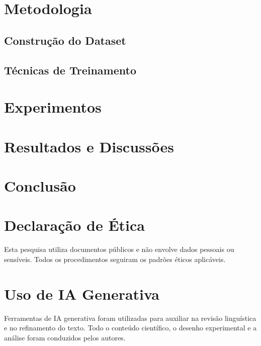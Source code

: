 \documentclass[12pt]{article}
\begin{document}


\section{Metodologia}\label{sec:metodologia}

\subsection{Construção do Dataset}\label{subsec:dataset}



\subsection{Técnicas de Treinamento}\label{subsec:treinamento}



\section{Experimentos}\label{sec:experimento}



\section{Resultados e Discussões}\label{sec:resultados}



% 




\section{Conclusão}\label{sec:conclusao}



\section*{Declaração de Ética}
Esta pesquisa utiliza documentos públicos e não envolve dados pessoais ou sensíveis. Todos os procedimentos seguiram os padrões éticos aplicáveis.

\section*{Uso de IA Generativa}
Ferramentas de IA generativa foram utilizadas para auxiliar na revisão linguística e no refinamento do texto. Todo o conteúdo científico, o desenho experimental e a análise foram conduzidos pelos autores.



\end{document}
